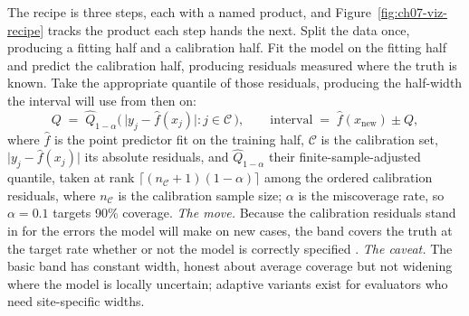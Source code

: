 The recipe is three steps, each with a named product, and Figure~\ref{fig:ch07-viz-recipe} tracks the product each step hands the next. Split the data once, producing a fitting half and a calibration half. Fit the model on the fitting half and predict the calibration half, producing residuals measured where the truth is known. Take the appropriate quantile of those residuals, producing the half-width the interval will use from then on:
\begin{equation}
  Q \;=\; \widehat{Q}_{1-\alpha}\!\bigl(\,\lvert y_j - \hat f(x_j)\rvert : j \in \mathcal{C}\,\bigr),
  \qquad
  \text{interval} \;=\; \hat f(x_{\text{new}}) \pm Q,
  \label{eq:ch07-viz-conformal}
\end{equation}
where $\hat f$ is the point predictor fit on the training half, $\mathcal{C}$ is the calibration set, $\lvert y_j-\hat f(x_j)\rvert$ its absolute residuals, and $\widehat{Q}_{1-\alpha}$ their finite-sample-adjusted quantile, taken at rank $\lceil(n_{\mathcal C}+1)(1-\alpha)\rceil$ among the ordered calibration residuals, where $n_{\mathcal C}$ is the calibration sample size; $\alpha$ is the miscoverage rate, so $\alpha=0.1$ targets 90\% coverage. \emph{The move.} Because the calibration residuals stand in for the errors the model will make on new cases, the band covers the truth at the target rate whether or not the model is correctly specified \parencite{lei2018distribution}. \emph{The caveat.} The basic band has constant width, honest about average coverage but not widening where the model is locally uncertain; adaptive variants exist for evaluators who need site-specific widths.

